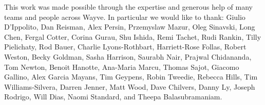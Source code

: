 \newline
\newline
\newline
\newline
\begin{ack}
\begin{small}
This work was made possible through the expertise and generous help of many teams and people across Wayve. In particular we would like to thank: Giulio D'Ippolito, Dan Reisman, Alex Persin, Przemyslaw Mazur, Oleg Sinavski, Long Chen, Fergal Cotter, Corina Gurau, Shu Ishida, Remi Tachet, Rudi Rankin, Tilly Pielichaty, Rod Bauer, Charlie Lyons-Rothbart, Harriett-Rose Follas, Robert Weston, Becky Goldman, Sasha Harrison, Saurabh Nair, Prajwal Chidananda, Tom Newton, Benoit Hanotte, Ana-Maria Marcu, Thomas Sajot, Giacomo Gallino, Alex Garcia Mayans, Tim Geypens, Robin Tweedie, Rebecca Hills, Tim Williams-Silvera, Darren Jenner, Matt Wood, Dave Chilvers, Danny Ly, Joseph Rodrigo, Will Dias, Naomi Standard, and Theepa Balasubramaniam.
\end{small}
\end{ack}


